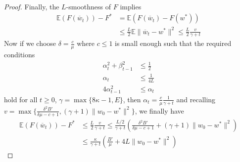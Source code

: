 \begin{proof}
Finally, the $L$-smoothness of $F$ implies 
\begin{align*}
\mathbb{E}(F(\overline{w}_{t}))-F^{\ast} & =\mathbb{E}(F(\overline{w}_{t})-F(w^{\ast}))\\
 & \leq\frac{L}{2}\mathbb{E}\|\overline{w}_{t}-w^{\ast}\|^{2}\leq\frac{L}{2}\frac{v}{\gamma+t}
\end{align*}
 Now if we choose $\delta=\frac{c}{\mu}$ where $c\leq1$ is small
enough such that the required conditions 
\begin{align*}
\alpha_{t}^{2}+\beta_{t-1}^{2} & \leq\frac{1}{2}\\
\alpha_{t} & \leq\frac{1}{4L}\\
4\alpha_{t-1}^{2} & \leq\alpha_{t}
\end{align*}
hold for all $t\geq0$, $\gamma=\max\{8\kappa-1,E\}$, then $\alpha_{t}=\frac{c}{\mu}\frac{1}{\gamma+t}$
and recalling $v=\max\{\frac{\delta^{2}B'}{\delta\mu-c+1},(\gamma+1)\|w_{0}-w^{\ast}\|^{2}\}$,
we finally have 
\begin{align*}
\mathbb{E}(F(\overline{w}_{t}))-F^{\ast} & \leq\frac{L}{2}\frac{v}{\gamma+t}\leq\frac{L/2}{\gamma+t}(\frac{\delta^{2}B'}{\delta\mu-c+1}+(\gamma+1)\|w_{0}-w^{\ast}\|^{2})\\
 & \leq\frac{\kappa}{\gamma+t}(\frac{B'}{\mu}+4L\|w_{0}-w^{\ast}\|^{2})
\end{align*}
\end{proof}